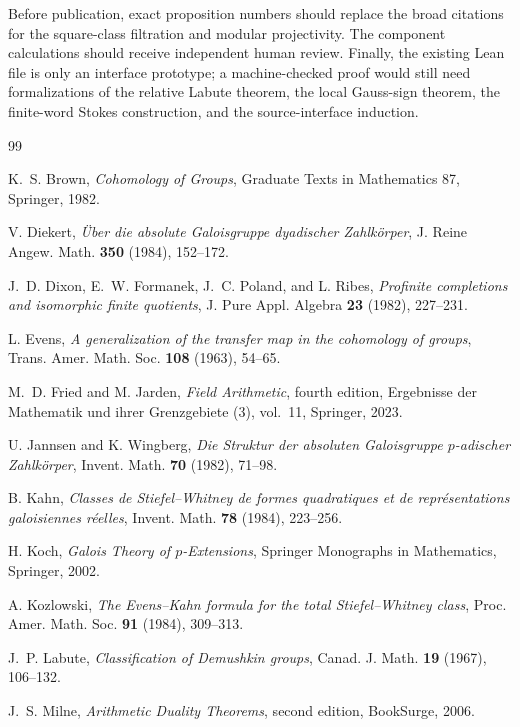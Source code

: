 \documentclass[11pt,reqno]{amsart}
\theoremstyle{definition}
\theoremstyle{remark}
\numberwithin{equation}{section}
\begin{document}
Before publication, exact proposition numbers should replace the broad
citations for the square-class filtration and modular projectivity.
The component calculations should receive independent human review.
Finally, the existing Lean file is only an interface prototype; a
machine-checked proof would still need formalizations of the relative
Labute theorem, the local Gauss-sign theorem, the finite-word Stokes
construction, and the source-interface induction.

\begin{thebibliography}{99}

K.~S. Brown,
\emph{Cohomology of Groups},
Graduate Texts in Mathematics 87, Springer, 1982.

V. Diekert,
\emph{\"Uber die absolute Galoisgruppe dyadischer Zahlk\"orper},
J. Reine Angew. Math. \textbf{350} (1984), 152--172.

J.~D. Dixon, E.~W. Formanek, J.~C. Poland, and L. Ribes,
\emph{Profinite completions and isomorphic finite quotients},
J. Pure Appl. Algebra \textbf{23} (1982), 227--231.

L. Evens,
\emph{A generalization of the transfer map in the cohomology of groups},
Trans. Amer. Math. Soc. \textbf{108} (1963), 54--65.

M.~D. Fried and M. Jarden,
\emph{Field Arithmetic}, fourth edition,
Ergebnisse der Mathematik und ihrer Grenzgebiete (3), vol.~11,
Springer, 2023.

U. Jannsen and K. Wingberg,
\emph{Die Struktur der absoluten Galoisgruppe \(p\)-adischer
Zahlk\"orper},
Invent. Math. \textbf{70} (1982), 71--98.

B. Kahn,
\emph{Classes de Stiefel--Whitney de formes quadratiques et de
repr\'esentations galoisiennes r\'eelles},
Invent. Math. \textbf{78} (1984), 223--256.

H. Koch,
\emph{Galois Theory of \(p\)-Extensions},
Springer Monographs in Mathematics, Springer, 2002.

A. Kozlowski,
\emph{The Evens--Kahn formula for the total Stiefel--Whitney class},
Proc. Amer. Math. Soc. \textbf{91} (1984), 309--313.

J.~P. Labute,
\emph{Classification of Demushkin groups},
Canad. J. Math. \textbf{19} (1967), 106--132.

J.~S. Milne,
\emph{Arithmetic Duality Theorems}, second edition,
BookSurge, 2006.


\end{thebibliography}
\end{document}
